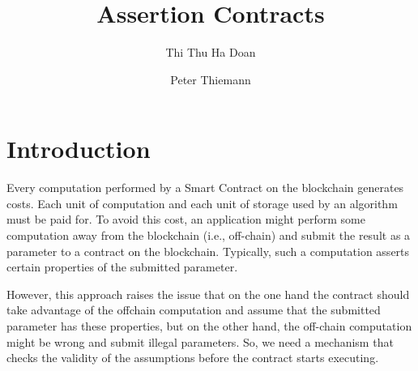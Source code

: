 \documentclass[runningheads]{llncs}
\begin{document}
%
\title{Assertion Contracts}
%
%
\author{Thi Thu Ha Doan\and Peter Thiemann}

%
%
%
\maketitle              %
%
\begin{abstract}

 \keywords{}
\end{abstract}
%
%
%
\section{Introduction}
\label{sec:introduction}

Every computation performed by a Smart Contract on the blockchain generates costs. Each
unit of computation and each unit of storage used by an algorithm must be paid for. To
avoid this cost, an application might perform some computation away from the blockchain
(i.e., off-chain) and submit the result as a parameter to a contract on the
blockchain. Typically, such a computation asserts certain properties of the 
submitted parameter. 

However, this approach raises the issue that on the one hand the contract should take
advantage of the offchain computation and assume that the submitted parameter has
these properties, but on the other hand, the off-chain computation might be wrong and
submit illegal parameters. So, we need a mechanism that checks the validity of the
assumptions before the contract starts executing.
\end{document}
